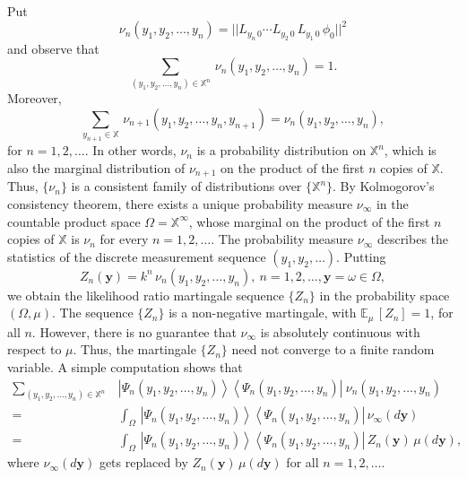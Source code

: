 Put 
$$
\nu_n(y_1,y_2,\ldots, y_n)=\vert\vert L_{y_{n}\, 0} \cdots L_{y_2\,0}\,L_{y_1\,0}\, \phi_0\vert\vert^2
$$
and observe that 
$$
\sum_{(y_1,y_2,\ldots, y_n)\in \mathbb{X}^n}\, \nu_n(y_1,y_2,\ldots, y_n)=1.
$$
Moreover, 
$$
\sum_{y_{n+1}\in \mathbb{X}}\, \nu_{n+1}(y_1,y_2,\ldots, y_n,y_{n+1})=\nu_n(y_1,y_2,\ldots, y_n),
$$
for $n=1,2,\ldots$. In other words, $\nu_n$ is a probability distribution on $\mathbb{X}^n$, which is also the marginal distribution of $\nu_{n+1}$ on the product of the first $n$ copies of $\mathbb{X}$.  Thus, $\{\nu_n\}$ is a consistent family of distributions over $\{\mathbb{X}^n\}$. By Kolmogorov's consistency theorem, there exists a unique probability measure $\nu_\infty$ in the countable product space 
$\Omega=\mathbb{X}^\infty$, whose  marginal on the product of the first $n$ copies of $\mathbb{X}$ is $\nu_n$ for every $n=1,2,\ldots$. The probability measure $\nu_\infty$ describes the statistics of the discrete measurement sequence $(y_1,y_2,\ldots )$.  Putting  
$$
Z_n(\mathbf{y})=k^n\, \nu_n(y_1,y_2,\ldots , y_n),\ n=1,2,\ldots, \mathbf{y}=\omega\in\Omega, 
$$
we obtain the likelihood ratio  martingale sequence $\{Z_n\}$ in the probability space $(\Omega, \mu)$. The sequence $\{Z_n\}$ is a non-negative martingale, with $\mathbb{E}_\mu\, [Z_n]=1$, for all $n$. However, there is no guarantee that $\nu_\infty$ is absolutely continuous with respect to $\mu$. Thus, the martingale $\{Z_n\}$ need not converge to a finite random variable.  A simple computation shows that 
\begin{align*}
	\sum_{(y_1,y_2,\ldots , y_n)\in \mathbb{X}^n}\, & \left\vert \Psi_n(y_1,y_2,\ldots , y_n)\right\rangle \left\langle 
	\Psi_n(y_1,y_2,\ldots , y_n)   \right\vert\ \nu_n(y_1,y_2,\ldots, y_n)  \\    
	=& \int_\Omega\, \left\vert \Psi_n(y_1,y_2,\ldots , y_n)\right\rangle \left\langle\Psi_n(y_1,y_2,\ldots , y_n)   
	\right\vert \, \nu_\infty(d\mathbf{y}) \\ 
	=& \int_\Omega\, \left\vert \Psi_n(y_1,y_2,\ldots , y_n)\right\rangle \left\langle\Psi_n(y_1,y_2,\ldots , y_n)\right\vert \, Z_n(\mathbf{y})\, \mu(d\mathbf{y}), 
\end{align*}
where  $\nu_\infty(d\mathbf{y})$ gets replaced by $Z_n(\mathbf{y})\, \mu(d \mathbf{y})$ for all $n=1,2,\ldots.$ 

